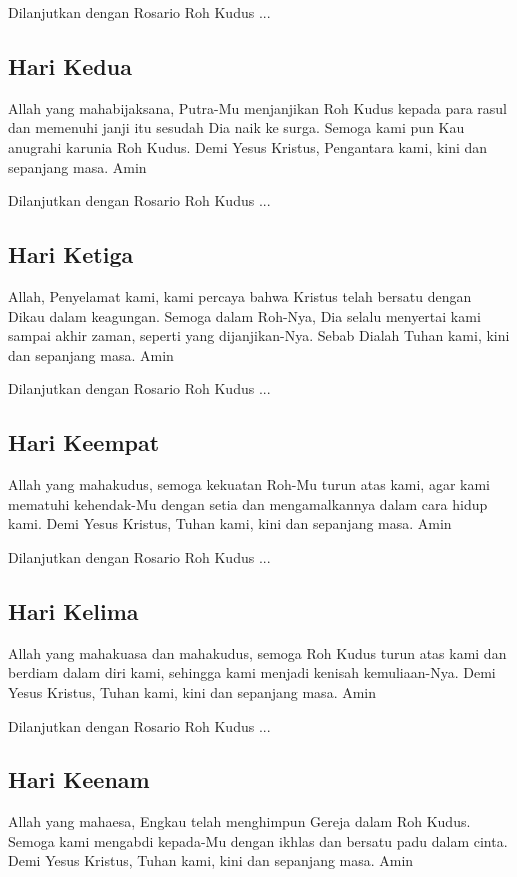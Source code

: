 \documentclass{article}
\begin{document}
Dilanjutkan dengan Rosario Roh Kudus ...

\subsection[Hari Kedua]{Hari Kedua}
Allah yang mahabijaksana, Putra-Mu menjanjikan Roh Kudus kepada para
rasul dan memenuhi janji itu sesudah Dia naik ke surga. Semoga kami pun
Kau anugrahi karunia Roh Kudus. Demi Yesus Kristus, Pengantara kami,
kini dan sepanjang masa. Amin

Dilanjutkan dengan Rosario Roh Kudus ...

\subsection[Hari Ketiga]{Hari Ketiga}
Allah, Penyelamat kami, kami percaya bahwa Kristus telah bersatu dengan
Dikau dalam keagungan. Semoga dalam Roh-Nya, Dia selalu menyertai kami
sampai akhir zaman, seperti yang dijanjikan-Nya. Sebab Dialah Tuhan
kami, kini dan sepanjang masa. Amin

Dilanjutkan dengan Rosario Roh Kudus ...

\subsection[Hari Keempat]{Hari Keempat}
Allah yang mahakudus, semoga kekuatan Roh-Mu turun atas kami, agar kami
mematuhi kehendak-Mu dengan setia dan mengamalkannya dalam cara hidup
kami. Demi Yesus Kristus, Tuhan kami, kini dan sepanjang masa. Amin

Dilanjutkan dengan Rosario Roh Kudus ...

\subsection[Hari Kelima]{Hari Kelima}
Allah yang mahakuasa dan mahakudus, semoga Roh Kudus turun atas kami dan
berdiam dalam diri kami, sehingga kami menjadi kenisah kemuliaan-Nya.
Demi Yesus Kristus, Tuhan kami, kini dan sepanjang masa. Amin

Dilanjutkan dengan Rosario Roh Kudus ...

\subsection[Hari Keenam]{Hari Keenam}
Allah yang mahaesa, Engkau telah menghimpun Gereja dalam Roh Kudus.
Semoga kami mengabdi kepada-Mu dengan ikhlas dan bersatu padu dalam
cinta. Demi Yesus Kristus, Tuhan kami, kini dan sepanjang masa. Amin
\end{document}
